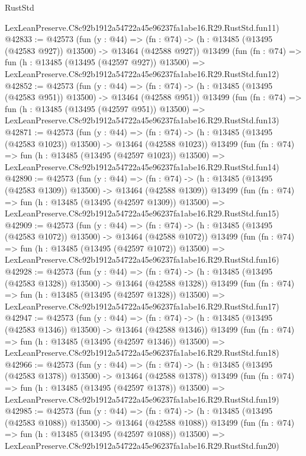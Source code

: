 \begin{lexlean}{RustStd}
\begin{coremodule}
    LexLeanPreserve.C8c92b1912a54722a45e96237fa1abe16.R29.RustStd.fun11)
@42833 := @42573
    (fun (y : @44) =>
    (fn : @74) -> (h : @13485 (@13495 (@42583 @927)) @13500) -> @13464 (@42588 @927))
    @13499
    (fun (fn : @74) =>
    fun (h : @13485 (@13495 (@42597 @927)) @13500) =>
    LexLeanPreserve.C8c92b1912a54722a45e96237fa1abe16.R29.RustStd.fun12)
@42852 := @42573
    (fun (y : @44) =>
    (fn : @74) -> (h : @13485 (@13495 (@42583 @951)) @13500) -> @13464 (@42588 @951))
    @13499
    (fun (fn : @74) =>
    fun (h : @13485 (@13495 (@42597 @951)) @13500) =>
    LexLeanPreserve.C8c92b1912a54722a45e96237fa1abe16.R29.RustStd.fun13)
@42871 := @42573
    (fun (y : @44) =>
    (fn : @74) -> (h : @13485 (@13495 (@42583 @1023)) @13500) -> @13464 (@42588 @1023))
    @13499
    (fun (fn : @74) =>
    fun (h : @13485 (@13495 (@42597 @1023)) @13500) =>
    LexLeanPreserve.C8c92b1912a54722a45e96237fa1abe16.R29.RustStd.fun14)
@42890 := @42573
    (fun (y : @44) =>
    (fn : @74) -> (h : @13485 (@13495 (@42583 @1309)) @13500) -> @13464 (@42588 @1309))
    @13499
    (fun (fn : @74) =>
    fun (h : @13485 (@13495 (@42597 @1309)) @13500) =>
    LexLeanPreserve.C8c92b1912a54722a45e96237fa1abe16.R29.RustStd.fun15)
@42909 := @42573
    (fun (y : @44) =>
    (fn : @74) -> (h : @13485 (@13495 (@42583 @1072)) @13500) -> @13464 (@42588 @1072))
    @13499
    (fun (fn : @74) =>
    fun (h : @13485 (@13495 (@42597 @1072)) @13500) =>
    LexLeanPreserve.C8c92b1912a54722a45e96237fa1abe16.R29.RustStd.fun16)
@42928 := @42573
    (fun (y : @44) =>
    (fn : @74) -> (h : @13485 (@13495 (@42583 @1328)) @13500) -> @13464 (@42588 @1328))
    @13499
    (fun (fn : @74) =>
    fun (h : @13485 (@13495 (@42597 @1328)) @13500) =>
    LexLeanPreserve.C8c92b1912a54722a45e96237fa1abe16.R29.RustStd.fun17)
@42947 := @42573
    (fun (y : @44) =>
    (fn : @74) -> (h : @13485 (@13495 (@42583 @1346)) @13500) -> @13464 (@42588 @1346))
    @13499
    (fun (fn : @74) =>
    fun (h : @13485 (@13495 (@42597 @1346)) @13500) =>
    LexLeanPreserve.C8c92b1912a54722a45e96237fa1abe16.R29.RustStd.fun18)
@42966 := @42573
    (fun (y : @44) =>
    (fn : @74) -> (h : @13485 (@13495 (@42583 @1378)) @13500) -> @13464 (@42588 @1378))
    @13499
    (fun (fn : @74) =>
    fun (h : @13485 (@13495 (@42597 @1378)) @13500) =>
    LexLeanPreserve.C8c92b1912a54722a45e96237fa1abe16.R29.RustStd.fun19)
@42985 := @42573
    (fun (y : @44) =>
    (fn : @74) -> (h : @13485 (@13495 (@42583 @1088)) @13500) -> @13464 (@42588 @1088))
    @13499
    (fun (fn : @74) =>
    fun (h : @13485 (@13495 (@42597 @1088)) @13500) =>
    LexLeanPreserve.C8c92b1912a54722a45e96237fa1abe16.R29.RustStd.fun20)

\end{coremodule}
\end{lexlean}
